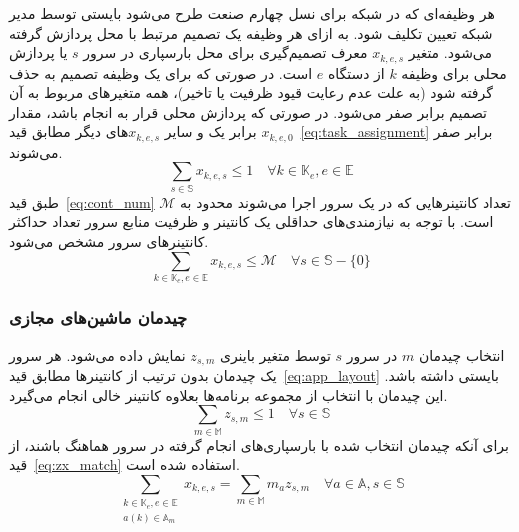 هر وظیفه‌ای که در شبکه  برای نسل چهارم صنعت طرح می‌شود بایستی توسط مدیر شبکه تعیین تکلیف شود. به ازای هر وظیفه یک تصمیم مرتبط با محل پردازش گرفته می‌شود. متغیر $x_{k,e,s}$ معرف تصمیم‌گیری برای محل  بارسپاری در سرور $s$ یا پردازش محلی برای وظیفه $k$ از دستگاه $e$ است. در صورتی که برای یک وظیفه تصمیم به حذف گرفته شود (به علت عدم رعایت قیود ظرفیت یا تاخیر)، همه متغیرهای مربوط به آن تصمیم برابر صفر می‌شود. در صورتی که پردازش محلی قرار به انجام باشد، مقدار $x_{k,e,0}$ برابر یک و سایر $x_{k,e,s}$های دیگر مطابق قید~\eqref{eq:task_assignment} برابر صفر می‌شوند.
\begin{equation} \label{eq:task_assignment}
    \sum_{s \in \mathbb{S}} x_{k,e,s} \leq 1 \quad \forall k \in \mathbb{K}_e, e \in \mathbb{E}
\end{equation}
طبق قید‍~\eqref{eq:cont_num} تعداد کانتینرهایی که در یک سرور اجرا می‌شوند محدود به $\mathcal{M}$ است. با توجه به نیازمندی‌های حداقلی یک کانتینر و ظرفیت منابع سرور تعداد حداکثر کانتینرهای سرور مشخص می‌شود.
\begin{equation} \label{eq:cont_num}
    \sum_{k \in \mathbb{K}_e, e \in \mathbb{E}} x_{k,e,s} \leq \mathcal{M} \quad \forall s \in \mathbb{S} - \{0\}
\end{equation}

\subsubsection{چیدمان ماشین‌های مجازی}
انتخاب چیدمان $m$ در سرور $s$ توسط متغیر باینری $z_{s,m}$ نمایش داده می‌شود. هر سرور یک چیدمان بدون ترتیب از کانتینرها مطابق قید~\eqref{eq:app_layout} بایستی داشته باشد. این چیدمان با انتخاب از مجموعه برنامه‌ها بعلاوه کانتینر خالی انجام می‌گیرد.
\begin{equation} \label{eq:app_layout}
    \sum_{m \in \mathbb{M}} z_{s,m} \leq 1 \quad \forall s \in \mathbb{S}
\end{equation}
برای آنکه چیدمان انتخاب شده با بارسپاری‌های انجام گرفته در سرور هماهنگ باشند، از قید~\eqref{eq:zx_match} استفاده شده است.
\begin{equation} \label{eq:zx_match}
    \sum_{\substack{k \in \mathbb{K}_e, e \in \mathbb{E} \\ a(k) \in \mathbb{A}_m}} x_{k,e,s} = \sum_{m \in \mathbb{M}} m_a z_{s,m} \quad \forall a \in \mathbb{A}, s \in \mathbb{S}
\end{equation}

